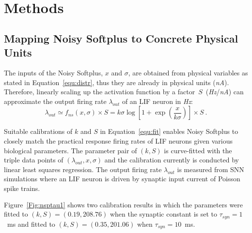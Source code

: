 \documentclass{article}
\begin{document}
	
	\section{Methods}	
	\label{sec:meth}
	
	\subsection{Mapping Noisy Softplus to Concrete Physical Units}
	\label{sec:af_model}
	The inputs of the Noisy Softplus, $x$ and $\sigma$, are obtained from physical variables as stated in Equation~\ref{equ:distr}, thus they are already in physical units (\textit{nA}).
	Therefore, linearly scaling up the activation function by a factor~$S$~(\textit{Hz}/\textit{nA}) can approximate the output firing rate $\lambda_{out}$ of an LIF neuron in \textit{Hz}:
	\begin{equation}
	\lambda_{out} \simeq f_{ns}(x, \sigma) \times S = k \sigma \log [1 + \exp(\frac{x}{k \sigma})] \times S~.
	\label{equ:fit}
	\end{equation}	
	
	
	Suitable calibrations of $k$ and $S$ in Equation~\ref{equ:fit} enables Noisy Softplus to closely match the practical response firing rates of LIF neurons given various biological parameters.
	The parameter pair of $(k, S)$ is curve-fitted with the triple data points of $(\lambda_{out}, x, \sigma)$ and the calibration currently is conducted by linear least squares regression.
	The output firing rate $\lambda_{out}$ is measured from SNN simulations where an LIF neuron is driven by synaptic input current of Poisson spike trains.

	Figure~\ref{Fig:nsptau1} shows two calibration results in which 
	the parameters were fitted to $(k, S)=(0.19,208.76)$ when the synaptic constant is set to $\tau_{syn}=1$~ms and fitted to $(k, S)=(0.35,201.06)$ when $\tau_{syn}=10$~ms.
	
\end{document}
